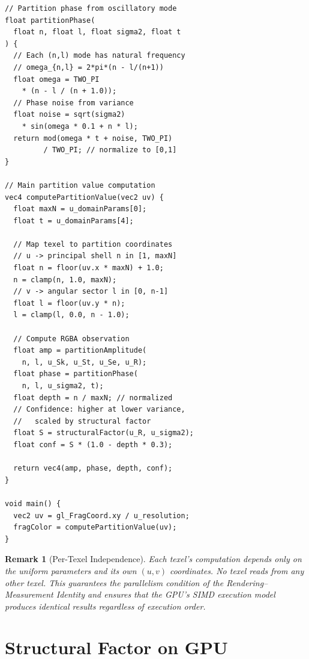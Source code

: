 \documentclass[11pt,twocolumn,a4paper]{article}
\newtheorem{remark}[theorem]{Remark}
\begin{document}
\begin{lstlisting}
// Partition phase from oscillatory mode
float partitionPhase(
  float n, float l, float sigma2, float t
) {
  // Each (n,l) mode has natural frequency
  // omega_{n,l} = 2*pi*(n - l/(n+1))
  float omega = TWO_PI
    * (n - l / (n + 1.0));
  // Phase noise from variance
  float noise = sqrt(sigma2)
    * sin(omega * 0.1 + n * l);
  return mod(omega * t + noise, TWO_PI)
         / TWO_PI; // normalize to [0,1]
}

// Main partition value computation
vec4 computePartitionValue(vec2 uv) {
  float maxN = u_domainParams[0];
  float t = u_domainParams[4];

  // Map texel to partition coordinates
  // u -> principal shell n in [1, maxN]
  float n = floor(uv.x * maxN) + 1.0;
  n = clamp(n, 1.0, maxN);
  // v -> angular sector l in [0, n-1]
  float l = floor(uv.y * n);
  l = clamp(l, 0.0, n - 1.0);

  // Compute RGBA observation
  float amp = partitionAmplitude(
    n, l, u_Sk, u_St, u_Se, u_R);
  float phase = partitionPhase(
    n, l, u_sigma2, t);
  float depth = n / maxN; // normalized
  // Confidence: higher at lower variance,
  //   scaled by structural factor
  float S = structuralFactor(u_R, u_sigma2);
  float conf = S * (1.0 - depth * 0.3);

  return vec4(amp, phase, depth, conf);
}

void main() {
  vec2 uv = gl_FragCoord.xy / u_resolution;
  fragColor = computePartitionValue(uv);
}
\end{lstlisting}

\begin{remark}[Per-Texel Independence]
Each texel's computation depends only on the uniform parameters and its own $(u,v)$ coordinates.
No texel reads from any other texel.
This guarantees the parallelism condition of the Rendering--Measurement Identity and ensures that the GPU's SIMD execution model produces identical results regardless of execution order.
\end{remark}



\section{Structural Factor on GPU}
\label{sec:structural}
\end{document}
